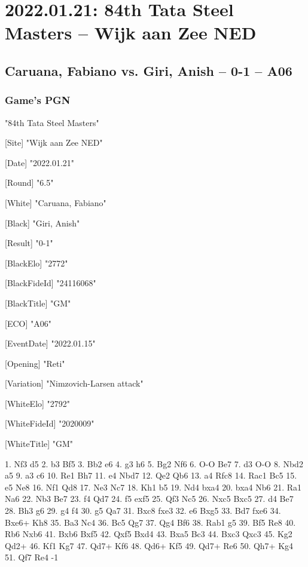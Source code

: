 \documentclass[9pt]{extarticle}
\begin{document}
\section*{2022.01.21: 84th Tata Steel Masters -- Wijk aan Zee NED}

\subsection*{Caruana, Fabiano vs. Giri, Anish -- 0-1 -- A06}
\subsubsection*{Game's PGN}
\begin{flushleft}
[Event] "84th Tata Steel Masters"

[Site] "Wijk aan Zee NED"

[Date] "2022.01.21"

[Round] "6.5"

[White] "Caruana, Fabiano"

[Black] "Giri, Anish"

[Result] "0-1"

[BlackElo] "2772"

[BlackFideId] "24116068"

[BlackTitle] "GM"

[ECO] "A06"

[EventDate] "2022.01.15"

[Opening] "Reti"

[Variation] "Nimzovich-Larsen attack"

[WhiteElo] "2792"

[WhiteFideId] "2020009"

[WhiteTitle] "GM"

\end{flushleft}
\begin{flushleft}
1. Nf3 d5 2. b3 Bf5 3. Bb2 e6 4. g3 h6 5. Bg2 Nf6 6. O-O Be7 7. d3 O-O 8. Nbd2 a5 9. a3 c6 10. Re1 Bh7 11. e4 Nbd7 12. Qe2 Qb6 13. a4 Rfc8 14. Rac1 Bc5 15. e5 Ne8 16. Nf1 Qd8 17. Ne3 Nc7 18. Kh1 b5 19. Nd4 bxa4 20. bxa4 Nb6 21. Ra1 Na6 22. Nb3 Be7 23. f4 Qd7 24. f5 exf5 25. Qf3 Nc5 26. Nxc5 Bxc5 27. d4 Be7 28. Bh3 g6 29. g4 f4 30. g5 Qa7 31. Bxc8 fxe3 32. e6 Bxg5 33. Bd7 fxe6 34. Bxe6+ Kh8 35. Ba3 Nc4 36. Bc5 Qg7 37. Qg4 Bf6 38. Rab1 g5 39. Bf5 Re8 40. Rb6 Nxb6 41. Bxb6 Bxf5 42. Qxf5 Bxd4 43. Bxa5 Bc3 44. Bxc3 Qxc3 45. Kg2 Qd2+ 46. Kf1 Kg7 47. Qd7+ Kf6 48. Qd6+ Kf5 49. Qd7+ Re6 50. Qh7+ Kg4 51. Qf7 Re4 \quad  {}-1
\end{flushleft}
\end{document}
